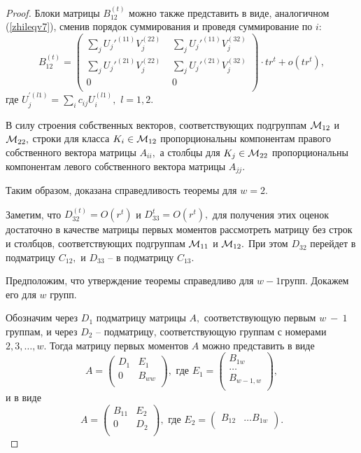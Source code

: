 \documentclass[10pt]{article}
\begin{document}
\begin{proof}
Блоки матрицы $B_{12}^{(t)}$ можно также представить в виде, аналогичном (\ref{zhileqv7}), сменив порядок суммирования и проведя суммирование по $i$:
$$
B_{12}^{(t)}=\left(
\begin{array}{cc} 
\sum_{j}U_j'^{(11)}V_j^{(22)} \,\, & \sum_{j}U_j'^{(11)}V_j^{(32)} \\
\sum_{j}U_j'^{(21)}V_j^{(22)} \,\,  & \sum_{j}U_j'^{(21)}V_j^{(32)} \\
0 \,\,&   0 \\
\end{array}
\right) \cdot  t r^t +o(t r^t),
$$
где $U_j^{\prime(l1)}=\sum_{i}c_{ij} U_i^{(l1)},$ $l=1,2.$
  
В силу строения собственных векторов, соответствующих подгруппам ${\cal M}_{12}$ и ${\cal M}_{22},$ строки для класса $K_i \in {\cal M}_{12}$ пропорциональны компонентам правого собственного вектора матрицы $A_{ii},$ а столбцы для $K_j \in {\cal M}_{22}$ пропорциональны компонентам левого собственного вектора матрицы $A_{jj}.$

Таким образом, доказана справедливость теоремы для $w=2.$ 

Заметим, что $D_{32}^{(t)}=O(r^t)$ и $D_{33}^t=O(r^t),$ для получения этих оценок достаточно в качестве матрицы первых моментов рассмотреть матрицу без строк и столбцов, соответствующих подгруппам ${\cal M}_{11}$ и ${\cal M}_{12}.$ При этом $D_{32}$ перейдет в подматрицу $C_{12},$ и $D_{33}$ -- в подматрицу $C_{13}.$

Предположим, что утверждение теоремы справедливо для $w-1 групп.$ Докажем его для $w$ групп.

Обозначим через $D_{1}$ подматрицу матрицы $A,$ соответствующую первым $w~-~1$ группам, и через $D_{2}$ -- подматрицу, соответствующую группам с номерами $2,3,\ldots, w$. 
Тогда матрицу первых моментов $A$ можно представить в виде 
$$
A=\left(
\begin{array}{cc} 
D_{1}  & E_1 \\
0 &    B_{w w} \\
\end{array}
\right)
, \,\,
\mbox{где} \,\, 
E_1 =\left(
\begin{array}{c} 
B_{1 w} \\
\ldots\\
B_{w-1,w} \\
\end{array}
\right)
,
$$
и в виде
$$
A=\left(
\begin{array}{cc} 
B_{11}  & E_{2} \\
0 &    D_{2} \\
\end{array}
\right)
, \,\,
\mbox{где} \,\, 
E_2 =\left(
\begin{array}{ccc} 
B_{12} &\ldots B_{1w} \\
\end{array}
\right)
.
$$


\end{proof}
\end{document}
